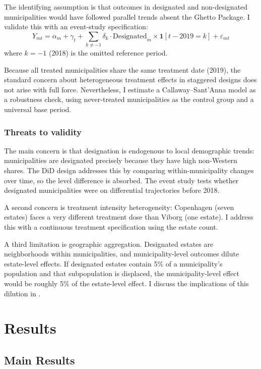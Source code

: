 \documentclass[12pt]{article}
\begin{document}
The identifying assumption is that outcomes in designated and non-designated municipalities would have followed parallel trends absent the Ghetto Package. I validate this with an event-study specification:
\begin{equation}
Y_{mt} = \alpha_m + \gamma_t + \sum_{k \neq -1} \delta_k \cdot \text{Designated}_m \times \mathbf{1}[t - 2019 = k] + \varepsilon_{mt}
\label{eq:eventstudy}
\end{equation}
where $k=-1$ (2018) is the omitted reference period.

Because all treated municipalities share the same treatment date (2019), the standard concern about heterogeneous treatment effects in staggered designs does not arise with full force. Nevertheless, I estimate a Callaway--Sant'Anna \citep{callaway2021difference} model as a robustness check, using never-treated municipalities as the control group and a universal base period.

\subsubsection*{Threats to validity} The main concern is that designation is endogenous to local demographic trends: municipalities are designated precisely because they have high non-Western shares. The DiD design addresses this by comparing within-municipality changes over time, so the level difference is absorbed. The event study tests whether designated municipalities were on differential trajectories before 2018.

A second concern is treatment intensity heterogeneity: Copenhagen (seven estates) faces a very different treatment dose than Viborg (one estate). I address this with a continuous treatment specification using the estate count.

A third limitation is geographic aggregation. Designated estates are neighborhoods within municipalities, and municipality-level outcomes dilute estate-level effects. If designated estates contain 5\% of a municipality's population and that subpopulation is displaced, the municipality-level effect would be roughly 5\% of the estate-level effect. I discuss the implications of this dilution in .

\section{Results}

\subsection{Main Results}
\end{document}
